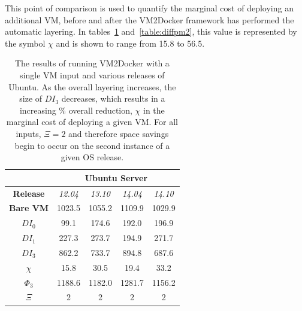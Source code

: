 This point of comparison is used to quantify the marginal cost of deploying an additional VM, before and after the VM2Docker framework has performed the automatic layering. In tables~\ref{table:diffpm} and~\ref{table:diffpm2}, this value is represented by the symbol $\chi$ and is shown to range from 15.8 to 56.5.
 
\begin{table}[h]
\centering
    \begin{tabular}{| c | c | c | c | c |}
    \hline
& \multicolumn{4}{|c|}{\bfseries Ubuntu Server} \\ \hline
    \bfseries Release & \itshape 12.04 & \itshape 13.10 & \itshape 14.04 & \itshape 14.10 \\ \hline
    \bfseries Bare VM & 1023.5  & 1055.2 & 1109.9 & 1029.9\\ \hline
    \bfseries $DI_0$ & 99.1 & 174.6 & 192.0 & 196.9  \\ \hline
    \bfseries $DI_1$ & 227.3 & 273.7 & 194.9 & 271.7  \\ \hline
    \bfseries $DI_3$ & 862.2 & 733.7 & 894.8 & 687.6\\ \hline 
\bfseries $\chi$ & 15.8 & 30.5 & 19.4 & 33.2\\ \hline 
     \bfseries $\Phi_3$ & 1188.6 & 1182.0 & 1281.7 & 1156.2\\ \hline
\bfseries $\Xi$ & 2 & 2 & 2 & 2\\ \hline
    \end{tabular}
\caption{The results of running VM2Docker with a single VM input and various releases of Ubuntu. As the overall layering increases, the size of $DI_3$ decreases, which results in a increasing \% overall reduction, $\chi$ in the marginal cost of deploying a given VM. For all inputs, $\Xi = 2$ and therefore space savings begin to occur on the second instance of a given OS release.}
\label{table:diffpm}
\end{table}

